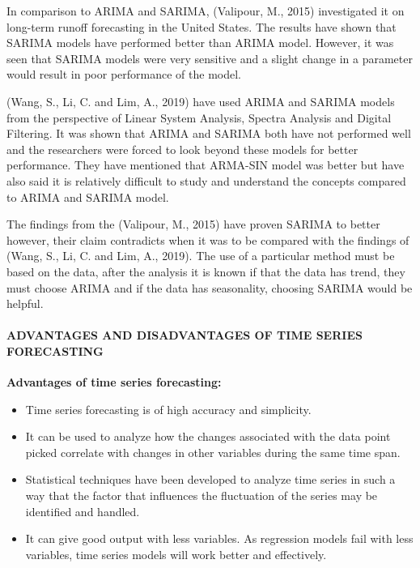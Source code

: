 \documentclass[
  letterpaper,
  DIV=11,
  numbers=noendperiod]{scrartcl}
\let\oldparagraph\paragraph
\renewcommand{\paragraph}[1]{\oldparagraph{#1}\mbox{}}
\begin{document}
In comparison to ARIMA and SARIMA, (Valipour, M., 2015) investigated it
on long-term runoff forecasting in the United States. The results have
shown that SARIMA models have performed better than ARIMA model.
However, it was seen that SARIMA models were very sensitive and a slight
change in a parameter would result in poor performance of the model.

(Wang, S., Li, C. and Lim, A., 2019) have used ARIMA and SARIMA models
from the perspective of Linear System Analysis, Spectra Analysis and
Digital Filtering. It was shown that ARIMA and SARIMA both have not
performed well and the researchers were forced to look beyond these
models for better performance. They have mentioned that ARMA-SIN model
was better but have also said it is relatively difficult to study and
understand the concepts compared to ARIMA and SARIMA model.

The findings from the (Valipour, M., 2015) have proven SARIMA to better
however, their claim contradicts when it was to be compared with the
findings of (Wang, S., Li, C. and Lim, A., 2019). The use of a
particular method must be based on the data, after the analysis it is
known if that the data has trend, they must choose ARIMA and if the data
has seasonality, choosing SARIMA would be helpful.

\hypertarget{advantages-and-disadvantages-of-time-series-forecasting}{%
\paragraph{\texorpdfstring{\textsc{\textbf{ADVANTAGES AND DISADVANTAGES
OF TIME SERIES
FORECASTING}}}{ADVANTAGES AND DISADVANTAGES OF TIME SERIES FORECASTING}}\label{advantages-and-disadvantages-of-time-series-forecasting}}

\textbf{Advantages of time series forecasting:}

\begin{itemize}
\item
  Time series forecasting is of high accuracy and simplicity.
\item
  It can be used to analyze how the changes associated with the data
  point picked correlate with changes in other variables during the same
  time span.
\item
  Statistical techniques have been developed to analyze time series in
  such a way that the factor that influences the fluctuation of the
  series may be identified and handled.
\item
  It can give good output with less variables. As regression models fail
  with less variables, time series models will work better and
  effectively.
\end{itemize}
\end{document}
